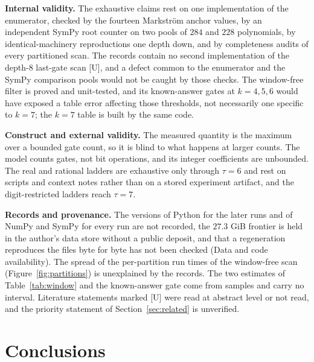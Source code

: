 \documentclass[11pt]{article}
\theoremstyle{definition}
\theoremstyle{remark}
\begin{document}
\textbf{Internal validity.} The exhaustive claims rest on one implementation of the enumerator, checked by the
fourteen Markstr\"om anchor values, by an independent SymPy root counter on two pools of $284$ and $228$
polynomials, by identical-machinery reproductions one depth down, and by completeness audits of every
partitioned scan. The records contain no second implementation of the depth-$8$ last-gate scan [U], and a defect
common to the enumerator and the SymPy comparison pools would not be caught by those checks. The
window-free filter is proved and unit-tested, and its known-answer gates at $k = 4, 5, 6$ would have exposed a
table error affecting those thresholds, not necessarily one specific to $k = 7$; the $k = 7$ table is built by the
same code.

\textbf{Construct and external validity.} The measured quantity is the maximum over a bounded gate count,
so it is blind to what happens at larger counts. The model counts gates, not bit operations, and its
integer coefficients are unbounded. The real and rational ladders are exhaustive only through $\tau = 6$ and rest on
scripts and context notes rather than on a stored experiment artifact, and the digit-restricted ladders reach
$\tau = 7$.

\textbf{Records and provenance.} The versions of Python for the later runs and of NumPy and SymPy for every run
are not recorded, the $27.3$ GiB frontier is held in the author's data store without a public deposit, and that a
regeneration reproduces the files byte for byte has not been checked (Data and code availability). The
spread of the per-partition run times of the window-free scan (Figure~\ref{fig:partitions}) is unexplained by
the records. The two estimates of Table~\ref{tab:window} and the known-answer gate come from samples and carry
no interval. Literature statements marked [U] were read at abstract level or not read, and the priority
statement of Section~\ref{sec:related} is unverified.

\section{Conclusions}\label{sec:conclusions}
\end{document}

